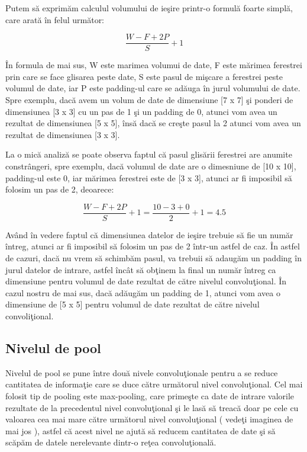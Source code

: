 Putem s\u{a} exprim\u{a}m calculul volumului de ie\c{s}ire printr-o formul\u{a} foarte simpl\u{a}, care arat\u{a} \^{i}n felul urm\u{a}tor:

$$ \frac{W - F + 2P }{S} + 1 $$

\^{I}n formula de mai sus, W este marimea volumui de date, F este m\u{a}rimea ferestrei prin care se face glisarea peste date, S este pasul de mi\c{s}care a ferestrei peste volumul de date, iar P este padding-ul care se ad\u{a}uga \^{i}n jurul volumului de date. Spre exemplu, dac\u{a} avem un volum de date de dimensiune [7 x 7] \c{s}i ponderi de dimensiunea [3 x 3] cu un pas de 1 \c{s}i un padding de 0, atunci vom avea un rezultat de dimensiunea [5 x 5], \^{i}ns\u{a} dac\u{a} se cre\c{s}te pasul la 2 atunci vom avea un rezultat de dimensiunea [3 x 3].

\par

La o mic\u{a} analiz\u{a} se poate observa faptul c\u{a} pasul glis\u{a}rii ferestrei are anumite constr\^{a}ngeri, spre exemplu, dac\u{a} volumul de date are o dimesniune de [10 x 10], padding-ul este 0, iar m\u{a}rimea ferestrei este de [3 x 3], atunci ar fi imposibil s\u{a} folosim un pas de 2, deoarece:

$$ \frac{W - F + 2P }{S} + 1 = \frac{10 - 3 + 0 }{2} + 1 = 4.5 $$

Av\^{a}nd \^{i}n vedere faptul c\u{a} dimensiunea datelor de ie\c{s}ire trebuie s\u{a} fie un num\u{a}r \^{i}ntreg, atunci ar fi imposibil s\u{a} folosim un pas de 2 \^{i}ntr-un astfel de caz. \^{I}n astfel de cazuri, dac\u{a} nu vrem s\u{a} schimb\u{a}m pasul, va trebuii s\u{a} adaug\u{a}m un padding \^{i}n jurul datelor de intrare, astfel \^{i}nc\^{a}t s\u{a} ob\c{t}inem la final un num\u{a}r \^{i}ntreg ca dimensiune pentru volumul de date rezultat de c\u{a}tre nivelul convolu\c{t}ional. \^{I}n cazul nostru de mai sus, dac\u{a} ad\u{a}ug\u{a}m un padding de 1, atunci vom avea  o dimensiune de [5 x 5] pentru volumul de date rezultat de c\u{a}tre nivelul convoli\c{t}ional.

\subsection{Nivelul de pool}

Nivelul de pool se pune \^{i}ntre dou\u{a} nivele convolu\c{t}ionale pentru a se reduce cantitatea de informa\c{t}ie care se duce c\u{a}tre urm\u{a}torul nivel convolu\c{t}ional. Cel mai folosit tip de pooling este max-pooling, care prime\c{s}te ca date de intrare valorile rezultate de la precedentul nivel convolu\c{t}ional \c{s}i le las\u{a} s\u{a} treac\u{a} doar pe cele cu valoarea cea mai mare c\u{a}tre urm\u{a}torul nivel convolu\c{t}ional ( vede\c{t}i imaginea de mai jos ), astfel c\u{a} acest nivel ne ajut\u{a} s\u{a} reducem cantitatea de date \c{s}i s\u{a} sc\u{a}p\u{a}m de datele nerelevante dintr-o re\c{t}ea convolu\c{t}ional\u{a}. 

